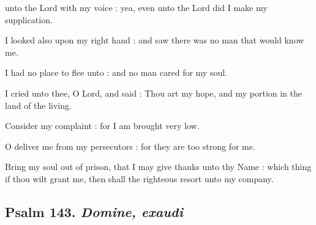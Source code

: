  unto the Lord with my voice : yea, even unto the Lord did I make my supplication.\par
{}
I looked also upon my right hand : and saw there was no man that would know me.\par
{}I had no place to flee unto : and no man cared for my soul.\par
{}I cried unto thee, O Lord, and said : Thou art my hope, and my portion in the land of the living.\par
{}Consider my complaint : for I am brought very low.\par
{}O deliver me from my persecutors : for they are too strong for me.\par
{}Bring my soul out of prison, that I may give thanks unto thy Name : which thing if thou wilt grant me, then shall the righteous resort unto my company.\par


\subsection{Psalm 143. \textit{Domine, exaudi}}

